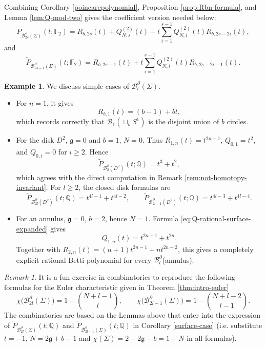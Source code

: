 \documentclass[11pt,a4paper]{article}
\numberwithin{equation}{section}
\theoremstyle{definition}
\newtheorem{exa}[thm]{Example}
\theoremstyle{remark}
\newtheorem{rem}[thm]{Remark}
\newcommand{\Q}{\mathbb{Q}}
\newcommand{\Si}{\Sigma}
\newcommand{\pa}{\partial}
\newcommand{\wt}{\widetilde}
\newcommand{\BB}{\mathcal B}
\newcommand{\mfg}{\mathfrak g}
\begin{document}
Combining Corollary \ref{poincarepolynomial}, Proposition
\ref{prop:Rbn-formula}, and Lemma \ref{lem:Q-mod-two} gives the coefficient
version needed below:
\begin{equation}\label{eq:surface-even-mod-two}
\wt P_{\BB_{2s}^{\pa}(\Si)}(t;\mathbb F_2)
=
R_{b,2s}(t)+Q^{(2)}_{N,s}(t)
+t\sum_{i=1}^{s-1}Q^{(2)}_{N,i}(t)R_{b,2s-2i}(t),
\end{equation}
and
\begin{equation}\label{eq:surface-odd-mod-two}
\wt P_{\BB_{2s-1}^{\pa}(\Si)}(t;\mathbb F_2)
=
R_{b,2s-1}(t)
+t\sum_{i=1}^{s-1}Q^{(2)}_{N,i}(t)R_{b,2s-2i-1}(t).
\end{equation}

\begin{exa}\label{exa:disk}\rm We discuss simple cases of $\BB_l^\pa (\Sigma)$.
\begin{itemize}
\item For \(n=1\), it gives
\begin{equation}\label{eq:Rb1}
R_{b,1}(t)=(b-1)+bt,
\end{equation}
which records correctly that \(\BB_1(\sqcup_bS^1)\) is the disjoint union of \(b\) circles.
\item For the disk \(D^2\), $\mfg =0$ and \(b=1\), \(N=0\).  Thus \(R_{1,n}(t)=t^{2n-1}\), \(Q_{0,1}=t^2\), and \(Q_{0,i}=0\) for \(i\ge2\).  Hence
\[
\wt P_{\BB_2^{\pa}(D^2)}(t;\Q)=t^3+t^2,
\]
which agrees with the direct computation in Remark \ref{rem:not-homotopy-invariant}.  For \(l\ge2\), the closed disk formulas are
\[
\wt P_{\BB_{2l}^{\pa}(D^2)}(t;\Q)=t^{4l-1}+t^{4l-2},
\qquad
\wt P_{\BB_{2l-1}^{\pa}(D^2)}(t;\Q)=t^{4l-3}+t^{4l-4}.
\]
\item 
For an annulus, \(\mathfrak g=0\), \(b=2\), hence \(N=1\).  Formula \eqref{eq:Q-rational-surface-expanded} gives
\[
Q_{1,n}(t)=t^{2n-1}+t^{2n}.
\]
Together with \(R_{2,n}(t)=(n+1)t^{2n-1}+n t^{2n-2}\), this gives a completely explicit rational Betti polynomial for every \(\BB_l^{\pa}\)(annulus).
\end{itemize}
\end{exa}

\begin{rem}\rm
    It is a fun exercise in combinatorics to reproduce the following formulas for the Euler characteristic given in Theorem \ref{thm:intro-euler}
\[
\chi\bigl(\BB^\partial_{2l}(\Sigma)\bigr)
=
1-\binom{N+l-1}{l},
\qquad
\chi\bigl(\BB^\partial_{2l-1}(\Sigma)\bigr)
=
1-\binom{N+l-2}{l-1}.
\]
The combinatorics are based on the Lemmas above that enter into the expression of $\wt P_{\BB_{2l}^{\pa}(\Si)}(t;\Q)$ and
$\wt P_{\BB_{2l-1}^{\pa}(\Si)}(t;\Q)$ in Corollary \ref{surface-case} (i.e. substitute \(t=-1\), $N= 2\mathfrak g + b-1$ and
$\chi (\Sigma )=2-2\mathfrak g-b=1-N$ in all formulas).
\end{rem}
\end{document}
